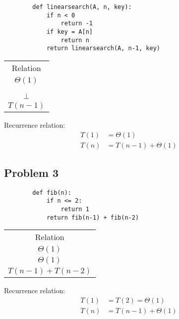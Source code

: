 \documentclass{article}
\begin{document}
\begin{multicols}{2}
    \begin{lstlisting}
        def linearsearch(A, n, key):
            if n < 0
                return -1
            if key = A[n]
                return n
            return linearsearch(A, n-1, key)
    \end{lstlisting}
    \columnbreak
    \footnotesize
    \begin{tabular}{c}
        Relation    \\
        $\Theta(1)$ \\
        \vline      \\
        \vline      \\
        $\bot$      \\
        $T(n-1)$    \\
    \end{tabular}
\end{multicols}

Recurrence relation:
\begin{align*}
    T(1) & = \Theta(1)          \\
    T(n) & = T(n-1) + \Theta(1)
\end{align*}

\subsection*{Problem 3}
\begin{multicols}{2}
    \begin{lstlisting}
        def fib(n):
            if n <= 2:
                return 1
            return fib(n-1) + fib(n-2)
    \end{lstlisting}
    \columnbreak
    \footnotesize
    \begin{tabular}{c}
        Relation          \\
        $\Theta(1)$       \\
        $\Theta(1)$       \\
        $T(n-1) + T(n-2)$ \\
    \end{tabular}
\end{multicols}

Recurrence relation:
\begin{align*}
    T(1) & = T(2) = \Theta(1)   \\
    T(n) & = T(n-1) + \Theta(1)
\end{align*}
\end{document}
